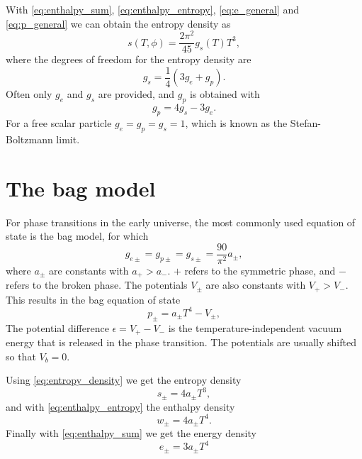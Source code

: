 With \eqref{eq:enthalpy_sum}, \eqref{eq:enthalpy_entropy}, \eqref{eq:e_general} and \eqref{eq:p_general} we can obtain the entropy density as
\cite[eq. S12]{borsanyi_lattice_2016}
\begin{equation}
s(T,\phi) = \frac{2\pi^2}{45} g_s(T) T^3,
\end{equation}
where the degrees of freedom for the entropy density are
\begin{equation}
g_s = \frac{1}{4} (3g_e + g_p).
\end{equation}
Often only $g_e$ and $g_s$ are provided, and $g_p$ is obtained with
\begin{equation}
g_p = 4g_s - 3g_e.
\end{equation}
For a free scalar particle $g_e = g_p = g_s = 1$, which is known as the Stefan-Boltzmann limit.
\iffalse
due to its reminiscence to the Stefan-Boltzmann law $j^* = \sigma T^4$,
which relates the power radiated by a black body to its temperature with the Stefan-Boltzmann constant $\sigma$.
\fi


\section{The bag model}
\label{bag_model}
For phase transitions in the early universe,
the most commonly used equation of state is the bag model, for which
\begin{equation}
g_{e\pm} = g_{p\pm} = g_{s\pm} = \frac{90}{\pi^2} a_\pm,
\end{equation}
where $a_\pm$ are constants with $a_+ > a_-$.
$+$ refers to the symmetric phase, and $-$ refers to the broken phase.
The potentials $V_\pm$ are also constants with $V_+ > V_-$.
This results in the bag equation of state
\cites[eq. 7.33]{lecture_notes}[eq. 8-9]{giese_2020}
\begin{equation}
p_\pm = a_\pm T^4 - V_\pm,
\label{eq:bag_p}
\end{equation}
The potential difference $\epsilon = V_+ - V_-$ is the temperature-independent vacuum energy that is released in the phase transition.
The potentials are usually shifted so that $V_b = 0$.
\cite{giese_2020}

Using \eqref{eq:entropy_density} we get the entropy density
\begin{equation}
s_\pm = 4 a_\pm T^3,
\end{equation}
and with \eqref{eq:enthalpy_entropy} the enthalpy density
\begin{equation}
w_\pm = 4 a_\pm T^4.
\end{equation}
Finally with \eqref{eq:enthalpy_sum} we get the energy density
\begin{equation}
e_\pm = 3 a_\pm T^4
\end{equation}

